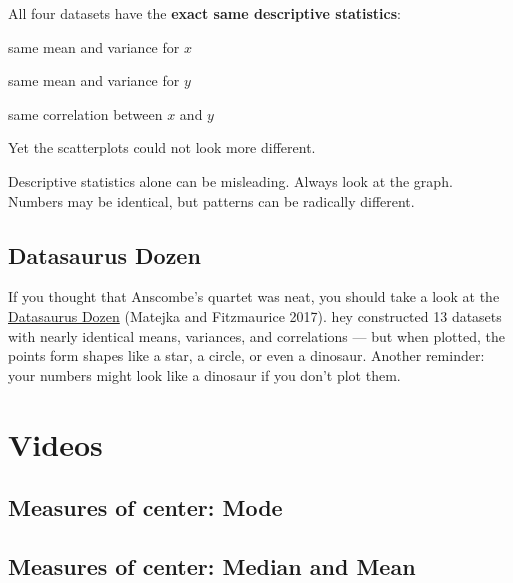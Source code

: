 \documentclass[
  letterpaper,
  DIV=11,
  numbers=noendperiod]{scrreprt}
\begin{document}
All four datasets have the \textbf{exact same descriptive statistics}:

same mean and variance for \(x\)

same mean and variance for \(y\)

same correlation between \(x\) and \(y\)

Yet the scatterplots could not look more different.

\begin{tcolorbox}[enhanced jigsaw, breakable, colback=white, opacitybacktitle=0.6, coltitle=black, toprule=.15mm, bottomtitle=1mm, leftrule=.75mm, arc=.35mm, title=\textcolor{quarto-callout-note-color}{\faInfo}\hspace{0.5em}{Takeaway}, opacityback=0, colframe=quarto-callout-note-color-frame, left=2mm, titlerule=0mm, toptitle=1mm, colbacktitle=quarto-callout-note-color!10!white, rightrule=.15mm, bottomrule=.15mm]

Descriptive statistics alone can be misleading. Always look at the
graph. Numbers may be identical, but patterns can be radically
different.

\end{tcolorbox}

\subsection{Datasaurus Dozen}\label{datasaurus-dozen}

If you thought that Anscombe's quartet was neat, you should take a look
at the
\href{https://www.autodeskresearch.com/publications/samestats}{Datasaurus
Dozen} (Matejka and Fitzmaurice 2017). hey constructed 13 datasets with
nearly identical means, variances, and correlations --- but when
plotted, the points form shapes like a star, a circle, or even a
dinosaur. Another reminder: your numbers might look like a dinosaur if
you don't plot them.

\section{Videos}\label{videos-1}

\subsection{Measures of center: Mode}\label{measures-of-center-mode}

\subsection{Measures of center: Median and
Mean}\label{measures-of-center-median-and-mean}
\end{document}
